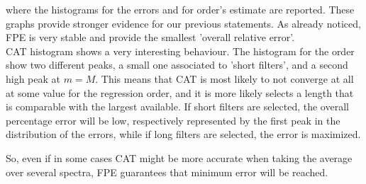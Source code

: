 \documentclass[twocolumn,showpacs,preprintnumbers,nofootinbib,prd,
superscriptaddress,10pt]{revtex4-1}
\begin{document}
where the histograms for the errors and for order's estimate are reported. These graphs provide stronger evidence for our previous statements. As already noticed, FPE is very stable and provide the smallest 'overall relative error'. \\
CAT histogram shows a very interesting behaviour. The histogram for the order show two different peaks,  a small one associated to 'short filters', and a second high peak at $m = M$. This means that CAT is most likely to not converge at all at some value for the regression order, and it is more likely selects a length that is comparable with the largest available.  If short filters are selected, the overall percentage error will be low, respectively represented by the first peak in the distribution of the errors, while if long filters are selected, the error is maximized. 

So, even if in some cases CAT might be more accurate when taking the average over several spectra, FPE guarantees that minimum error will be reached. 
\end{document}
